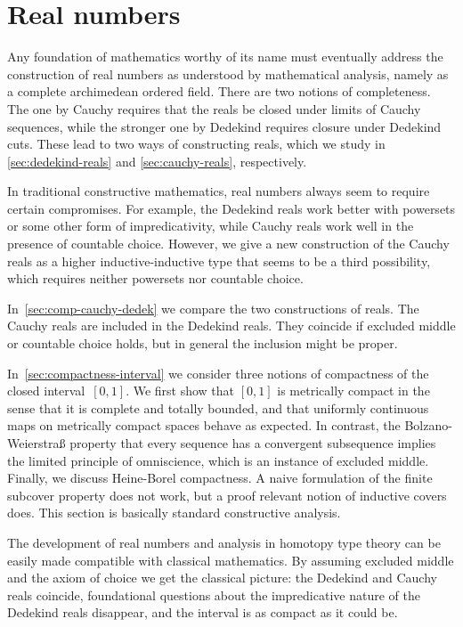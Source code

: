 \chapter{Real numbers}
\label{cha:real-numbers}

Any foundation of mathematics worthy of its name must eventually address the construction of real numbers as understood by mathematical analysis, namely as a complete archimedean ordered field. 
There are two notions of completeness. The one by Cauchy requires that the reals be closed under limits of Cauchy sequences, while the stronger one by Dedekind requires closure under Dedekind cuts.
These lead to two ways of constructing reals, which we study in \autoref{sec:dedekind-reals} and \autoref{sec:cauchy-reals}, respectively.

In traditional constructive mathematics, real numbers always seem to require certain compromises. For example, the Dedekind reals work better with powersets or some other form of impredicativity, while Cauchy reals work well in the presence of countable choice.
However, we give a new construction of the Cauchy reals as a higher inductive-inductive type that seems to be a third possibility, which requires neither powersets nor countable choice.

In~\autoref{sec:comp-cauchy-dedek} we compare the two constructions of reals. The Cauchy reals are included in the Dedekind reals. They coincide if excluded middle or countable choice holds, but in general the inclusion might be proper.

In~\autoref{sec:compactness-interval} we consider three notions of compactness of the closed interval~$[0,1]$. We first show that $[0,1]$ is metrically compact in the sense that it is complete and totally bounded, and that uniformly continuous maps on metrically compact spaces behave as expected. In contrast, the Bolzano-Weierstra\ss{} property that every sequence has a convergent subsequence implies the limited principle of omniscience, which is an instance of excluded middle. Finally, we discuss Heine-Borel compactness. A naive formulation of the finite subcover property does not work, but a proof relevant notion of inductive covers does.
This section is basically standard constructive analysis.

The development of real numbers and analysis in homotopy type theory can be easily made compatible with classical mathematics. By assuming excluded middle and the axiom of choice we get the classical picture: the Dedekind and Cauchy reals coincide, foundational questions about the impredicative nature of the Dedekind reals disappear, and the interval is as compact as it could be.

